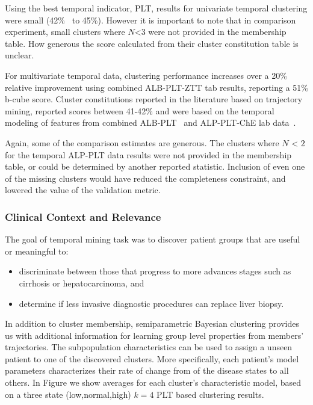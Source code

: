 Using the best temporal indicator, PLT, results for univariate temporal clustering were small (42\%~\cite{Hirano05} to 45\%).  However it is important to note that in comparison experiment, small clusters where $N$<$3$ were not provided in the membership table.  How generous the score calculated from their cluster constitution table is unclear.

For multivariate temporal data, clustering performance increases over a 20\% relative improvement using combined ALB-PLT-ZTT tab results, reporting a 51\% b-cube score.  Cluster constitutions reported in the literature based on trajectory mining, reported scores between 41-42\% and were based on the temporal modeling of features from combined ALB-PLT~\cite{Hirano07a,Hirano07b} and ALP-PLT-ChE lab data~\cite{Tsumoto12}.

Again, some of the comparison estimates are generous.  The clusters where $N$ < $2$ for the temporal ALP-PLT data results were not provided in the membership table, or could be determined by another reported statistic.  Inclusion of even one of the missing clusters would have reduced the completeness constraint, and lowered the value of the validation metric.

\subsubsection{Clinical Context and Relevance}
The goal of temporal mining task was to discover patient groups that are useful or meaningful to:
 \begin{itemize}
   \item discriminate between those that progress to more advances stages such as cirrhosis or hepatocarcinoma, and
   \item determine if less invasive diagnostic procedures can replace liver biopsy.
 \end{itemize}

In addition to cluster membership, semiparametric Bayesian clustering provides us with additional information for learning group level properties from members' trajectories.  The subpopulation characteristics can be used to assign a unseen patient to one of the discovered clusters.   More specifically, each patient's model parameters characterizes their rate of change from of the disease states to all others.  In Figure\cite{fig:hepq} we show averages for each cluster's characteristic model, based on a three state (low,normal,high) $k=4$ PLT based clustering results.

